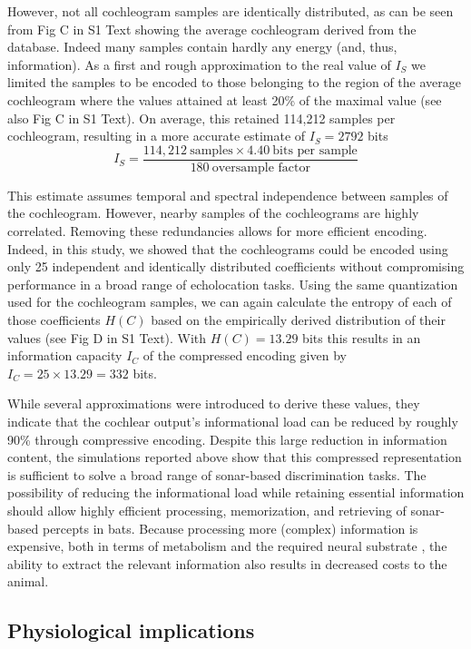 \documentclass[10pt,letterpaper]{article}
\begin{document}
However, not all cochleogram samples are identically distributed, as can be seen from Fig C in S1 Text  showing the average cochleogram derived from the database. Indeed many samples contain hardly any energy (and, thus, information). As a first and rough approximation to the real value of $I_S$ we limited the samples to be encoded to those belonging to the region of the average cochleogram where the values attained at least 20\% of the maximal value (see also Fig C in S1 Text). On average, this retained 114,212 samples per cochleogram, resulting in a more accurate estimate of $I_S=2792$ bits 
\begin{equation}
I_S = \frac{114,212\ \mbox{samples} \times 4.40\ \mbox{bits per sample}}{180\ \mbox{oversample factor}}
\end{equation}

This estimate assumes temporal and spectral independence between samples of the cochleogram. However, nearby samples of the cochleograms are highly correlated. Removing these redundancies allows for more efficient encoding. Indeed, in this study, we showed that the cochleograms could be encoded using only 25 independent and identically distributed coefficients without compromising performance in a broad range of echolocation tasks. Using the same quantization used for the cochleogram samples, we can again calculate the entropy of each of those coefficients $H(C)$ based on the empirically derived distribution of their values (see Fig D in S1 Text). With $H(C)=13.29$ bits this results in an information capacity $I_C$ of the compressed encoding given by $I_C=25 \times 13.29 =332$ bits.

While several approximations were introduced to derive these values, they indicate that the cochlear output's informational load can be reduced by roughly 90\% through compressive encoding. Despite this large reduction in information content, the simulations reported above show that this compressed representation is sufficient to solve a broad range of sonar-based discrimination tasks. The possibility of reducing the informational load while retaining essential information should allow highly efficient processing, memorization, and retrieving of sonar-based percepts in bats. Because processing more (complex) information is expensive, both in terms of metabolism and the required neural substrate \cite{Warrant2016,Sterling2015}, the ability to extract the relevant information also results in decreased costs to the animal.

\subsection*{Physiological implications}
\end{document}

